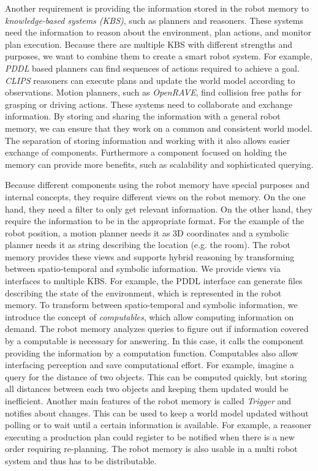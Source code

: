 Another requirement is providing the information stored in the robot
memory to \emph{knowledge-based systems (KBS)}, such as planners and
reasoners. These systems need the information to reason about the
environment, plan actions, and monitor plan execution. Because there
are multiple KBS with different strengths and purposes, we want to
combine them to create a smart robot system. For example, \emph{PDDL}
based planners can find sequences of actions required to achieve a
goal. \emph{CLIPS} reasoners can execute plans and update the world
model according to observations. Motion planners, such as
\emph{OpenRAVE}, find collision free paths for grasping or driving
actions. These systems need to collaborate and exchange
information. By storing and sharing the information with a general
robot memory, we can ensure that they work on a common and consistent
world model. The separation of storing information and working with it
also allows easier exchange of components. Furthermore a component
focused on holding the memory can provide more benefits, such as
scalability and sophisticated querying.

Because different components using the robot memory have special
purposes and internal concepts, they require different views on the
robot memory. On the one hand, they need a filter to only get relevant
information. On the other hand, they require the information to be in
the appropriate format. For the example of the robot position, a
motion planner needs it as 3D coordinates and a symbolic planner needs
it as string describing the location (e.g. the room). The robot memory
provides these views and supports hybrid reasoning by transforming
between spatio-temporal and symbolic information. We provide views via
interfaces to multiple KBS. For example, the PDDL interface can
generate files describing the state of the environment, which is
represented in the robot memory.  To transform between spatio-temporal
and symbolic information, we introduce the concept of
\emph{computables}, which allow computing information on demand. The
robot memory analyzes queries to figure out if information covered by
a computable is necessary for answering. In this case, it calls the
component providing the information by a computation
function. Computables also allow interfacing perception and save
computational effort. For example, imagine a query for the distance of
two objects. This can be computed quickly, but storing all distances
between each two objects and keeping them updated would be
inefficient.
%
Another main features of the robot memory is called \emph{Trigger} and
notifies about changes. This can be used to keep a world model updated
without polling or to wait until a certain information is
available. For example, a reasoner executing a production plan could
register to be notified when there is a new order requiring
re-planning. The robot memory is also usable in a multi robot
system and thus has to be distributable.


